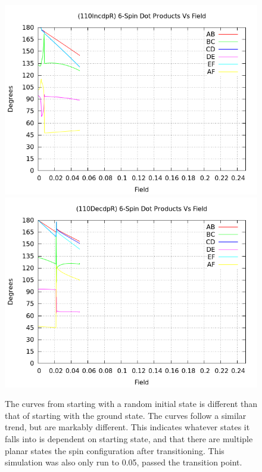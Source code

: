 \documentclass{article}
\begin{document}
\begin{figure}[ht]
\centering
\includegraphics[scale=0.5]{HVariedData/Pictures/110IncdpR.png}
\includegraphics[scale=0.5]{HVariedData/Pictures/110DecdpR.png}
\caption{The curves from starting with a random initial state is different than that of starting with the ground state.
The curves follow a similar trend, but are markably different. This indicates whatever states it falls into is
dependent on starting state, and that there are multiple planar states the spin configuration after transitioning. 
This simulation was also only run to 0.05, passed the transition point.}
\end{figure}
\clearpage

\end{document}

